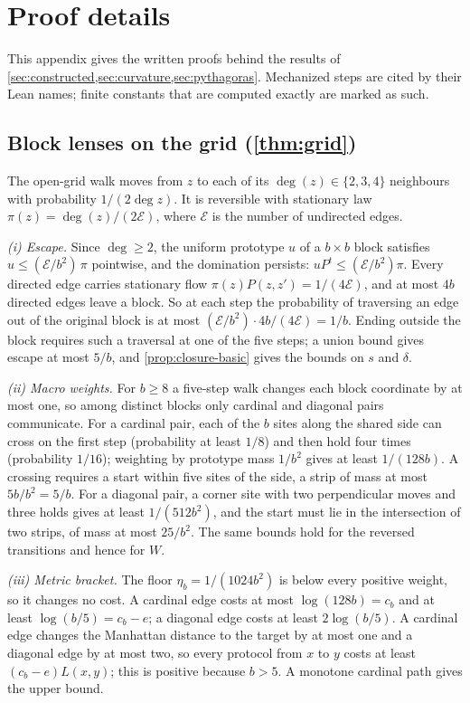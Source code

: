 \section{Proof details}
\label{app:proofs}

This appendix gives the written proofs behind the results of \cref{sec:constructed,sec:curvature,sec:pythagoras}.
Mechanized steps are cited by their Lean names; finite constants that are computed exactly are marked as such.

\subsection{Block lenses on the grid (\texorpdfstring{\cref{thm:grid}}{Theorem 6.1})}
\label{app:grid-proof}

The open-grid walk moves from $z$ to each of its $\deg(z)\in\{2,3,4\}$ neighbours with probability $1/(2\deg z)$.
It is reversible with stationary law $\pi(z)=\deg(z)/(2\mathcal E)$, where $\mathcal E$ is the number of undirected edges.

\emph{(i) Escape.}
Since $\deg\ge2$, the uniform prototype $u$ of a $b\times b$ block satisfies $u\le(\mathcal E/b^2)\,\pi$ pointwise, and the domination persists: $uP^t\le(\mathcal E/b^2)\pi$.
Every directed edge carries stationary flow $\pi(z)P(z,z')=1/(4\mathcal E)$, and at most $4b$ directed edges leave a block.
So at each step the probability of traversing an edge out of the original block is at most $(\mathcal E/b^2)\cdot4b/(4\mathcal E)=1/b$.
Ending outside the block requires such a traversal at one of the five steps; a union bound gives escape at most $5/b$, and \cref{prop:closure-basic} gives the bounds on $s$ and $\delta$.

\emph{(ii) Macro weights.}
For $b\ge8$ a five-step walk changes each block coordinate by at most one, so among distinct blocks only cardinal and diagonal pairs communicate.
For a cardinal pair, each of the $b$ sites along the shared side can cross on the first step (probability at least $1/8$) and then hold four times (probability $1/16$); weighting by prototype mass $1/b^2$ gives at least $1/(128b)$.
A crossing requires a start within five sites of the side, a strip of mass at most $5b/b^2=5/b$.
For a diagonal pair, a corner site with two perpendicular moves and three holds gives at least $1/(512b^2)$, and the start must lie in the intersection of two strips, of mass at most $25/b^2$.
The same bounds hold for the reversed transitions and hence for $W$.

\emph{(iii) Metric bracket.}
The floor $\eta_b=1/(1024b^2)$ is below every positive weight, so it changes no cost.
A cardinal edge costs at most $\log(128b)=c_b$ and at least $\log(b/5)=c_b-e$; a diagonal edge costs at least $2\log(b/5)$.
A cardinal edge changes the Manhattan distance to the target by at most one and a diagonal edge by at most two, so every protocol from $x$ to $y$ costs at least $(c_b-e)L(x,y)$; this is positive because $b>5$.
A monotone cardinal path gives the upper bound.

